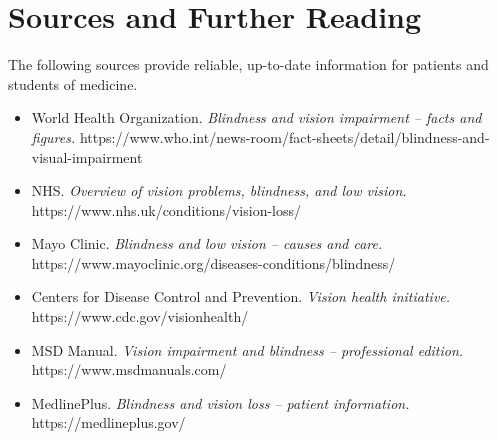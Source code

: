 \section*{Sources and Further Reading}
The following sources provide reliable, up-to-date information for patients and students of medicine.

\begin{itemize}
    \item World Health Organization. \textit{Blindness and vision impairment -- facts and figures.} https://www.who.int/news-room/fact-sheets/detail/blindness-and-visual-impairment
    \item NHS. \textit{Overview of vision problems, blindness, and low vision.} https://www.nhs.uk/conditions/vision-loss/
    \item Mayo Clinic. \textit{Blindness and low vision -- causes and care.} https://www.mayoclinic.org/diseases-conditions/blindness/
    \item Centers for Disease Control and Prevention. \textit{Vision health initiative.} https://www.cdc.gov/visionhealth/
    \item MSD Manual. \textit{Vision impairment and blindness -- professional edition.} https://www.msdmanuals.com/
    \item MedlinePlus. \textit{Blindness and vision loss -- patient information.} https://medlineplus.gov/
\end{itemize}
